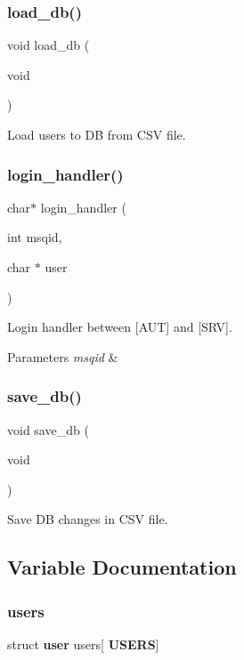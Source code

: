 \subsubsection{load\+\_\+db()}
{\footnotesize\ttfamily void load\+\_\+db (\begin{DoxyParamCaption}\item[{void}]{ }\end{DoxyParamCaption})}



Load users to DB from C\+SV file. 

\mbox{\label{auth_8h_a7a9845bb1a55c99afdd16add9b4b3808}} 
\subsubsection{login\+\_\+handler()}
{\footnotesize\ttfamily char$\ast$ login\+\_\+handler (\begin{DoxyParamCaption}\item[{int}]{msqid,  }\item[{char $\ast$}]{user }\end{DoxyParamCaption})}



Login handler between [A\+UT] and [S\+RV]. 


\begin{DoxyParams}{Parameters}
{\em msqid} & \\
\hline
\end{DoxyParams}
\mbox{\label{auth_8h_a7145eb48ec5e46fbb39b0b174a026cd1}} 
\subsubsection{save\+\_\+db()}
{\footnotesize\ttfamily void save\+\_\+db (\begin{DoxyParamCaption}\item[{void}]{ }\end{DoxyParamCaption})}



Save DB changes in C\+SV file. 



\subsection{Variable Documentation}
\mbox{\label{auth_8h_ad1b6438b2448da2b01d9887f58f5fb66}} 
\subsubsection{users}
{\footnotesize\ttfamily struct \textbf{ user} users[\textbf{ U\+S\+E\+RS}]}

